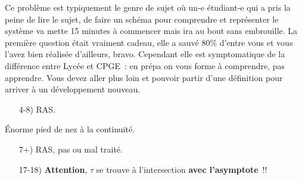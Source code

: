 \documentclass[a4paper, 10pt, final, garamond]{book}
\begin{document}
\setcounter{section}{0}
Ce problème est typiquement le genre de sujet où un-e étudiant-e qui a pris la
peine de lire le sujet, de faire un schéma pour comprendre et représenter le
système va mette 15 minutes à commencer mais ira au bout sans embrouille.
\smallbreak
La première question était vraiment cadeau, elle a sauvé 80\% d'entre vous et
vous l'avez bien réalisée d'ailleurs, bravo. Cependant elle est symptomatique de
la différence entre Lycée et CPGE~: en prépa on vous forme à comprendre, pas
apprendre. Vous devez aller plus loin et pouvoir partir d'une
définition pour arriver à un développement nouveau.
\begin{enumerate}
	  $\Ra$ dipôle équivalent à un
	interrupteur ouvert.
	 Lecture de l'énoncé. \textbf{Attention}, n'appliquez pas $\ln (~)$
	sur des nombres négatifs~! $-\exr^{-t/\tau_1} = \frac{U_a}{E}-1$ ne se passe
	pas au $\ln $, il faut l'appliquer sur $\exr^{-t/\tau_1} = 1 - \frac{U_a}{E} =
		\frac{E-U_a}{E}$. Il faut prendre l'habitude de \textbf{simplifier}~: avoir
	l'expression littérale d'un temps qui commence par $t_a = -\ln (~)$ c'est
	\textit{très} inquiétant puisqu'un temps est positif.
	 Exercice des plus classiques~: RC avec une maille parallèle, donc
	un nœud, donc une LdN. Un peu moins classique, mais clair avec un schéma, la
	condition initale est en $t=t_a$ et n'est pas $E$~!
	\item[4-8)]{} RAS.
\end{enumerate}

Énorme pied de nez à la continuité.
\begin{enumerate}
	 \textbf{NON}, $u$ n'est \textbf{PAS CONTINU} dans un circuit avec
	une bobine~!!! Pour trouver les CI, schéma et LdM.
	 Bobine en RP $\equiv$ fil. LdM.
	 Ne vous précipitez pas, ça n'est pas un RL typique du cours. Il y a
	deux résistances.
	 RAS, TB.
	 Deux choix, comme dans le cours. Une seule bonne réponse.
	 Deux points gratuits pour les asymptotes, mais grosses
	incompréhensions de $\tau$ ou $5\tau$.
	\item[7+)]{} RAS, pas ou mal traité.
	\item[17-18)] \textbf{Attention}, $\tau$ se trouve à l'intersection
		\textbf{avec l'asymptote}~!!
\end{enumerate}
\end{document}
